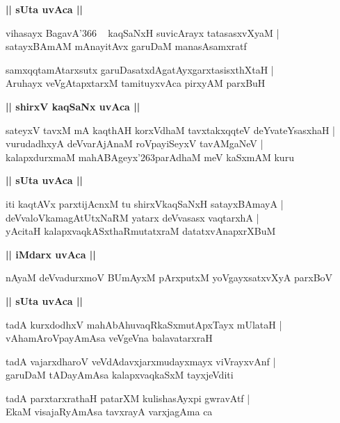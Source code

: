 \documentclass[twoside,12pt,openright]{book}
\def\S{\char'263}
\newcounter{shloka}[chapter]
\def\uvaca#1{\centerline{{\large\textbf{#1}}}}
\begin{document}
\uvaca{|| sUta uvAca ||}

\begin{shloka}%
vihasayx BagavA\char'366 ~ kaqSaNxH suvicArayx tatasasxvXyaM |\\
satayxBAmAM mAnayitAvx garuDaM manasAsamxratf
\end{shloka}

\begin{shloka}%
samxqqtamAtarxsutx garuDasatxdAgatAyxgarxtasisxthXtaH |\\
Aruhayx veVgAtapxtarxM tamituyxvAca pirxyAM parxBuH 
\end{shloka}

\uvaca{|| shirxV kaqSaNx uvAca ||}

\begin{shloka}%
sateyxV tavxM mA kaqthAH korxVdhaM tavxtakxqqteV deYvateYsasxhaH |\\
vurudadhxyA deVvarAjAnaM roVpayiSeyxV tavAMgaNeV |\\
kalapxdurxmaM mahABAgeyx\S parAdhaM meV kaSxmAM kuru
\end{shloka}

\uvaca{|| sUta uvAca ||}

\begin{shloka}%
iti kaqtAVx parxtijAcnxM tu shirxVkaqSaNxH satayxBAmayA |\\
deVvaloVkamagAtUtxNaRM yatarx deVvasasx vaqtarxhA |\\
yAcitaH kalapxvaqkASxthaRmutatxraM datatxvAnapxrXBuM 
\end{shloka}

\uvaca{|| iMdarx uvAca ||}

\begin{shloka}%
nAyaM deVvadurxmoV BUmAyxM pArxputxM yoVgayxsatxvXyA parxBoV 
\end{shloka}

\uvaca{|| sUta uvAca ||}

\begin{shloka}%
tadA kurxdodhxV mahAbAhuvaqRkaSxmutApxTayx mUlataH |\\
vAhamAroVpayAmAsa veVgeVna balavatarxraH 
\end{shloka}

\begin{shloka}%
tadA vajarxdharoV veVdAdavxjarxmudayxmayx viVrayxvAnf |\\
garuDaM tADayAmAsa kalapxvaqkaSxM tayxjeVditi
\end{shloka}

\begin{shloka}%
tadA parxtarxrathaH patarXM kulishasAyxpi gwravAtf |\\
EkaM visajaRyAmAsa tavxrayA varxjagAma ca 
\end{shloka}
\end{document}
